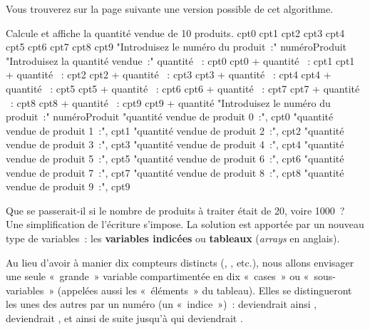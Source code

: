 		Vous trouverez sur la page suivante une version possible de cet
		algorithme.
	
		\vfill
		\begin{pseudocode}
		\LComment Calcule et affiche la quantité vendue de 10 produits.
			\Empty
			\Empty
			\Let cpt0 
			\Let cpt1 
			\Let cpt2 
			\Let cpt3 
			\Let cpt4 
			\Let cpt5 
			\Let cpt6 
			\Let cpt7 
			\Let cpt8 
			\Let cpt9 
			\Empty
			\Write "Introduisez le numéro du produit~:"
			\Read numéroProduit
			\Empty
			\Empty
				\Write "Introduisez la quantité vendue~:"
				\Read quantité
				\Empty
					~: cpt0 \Gets cpt0 + quantité
					~: cpt1 \Gets cpt1 + quantité
					~: cpt2 \Gets cpt2 + quantité
					~: cpt3 \Gets cpt3 + quantité
					~: cpt4 \Gets cpt4 + quantité
					~: cpt5 \Gets cpt5 + quantité
					~: cpt6 \Gets cpt6 + quantité
					~: cpt7 \Gets cpt7 + quantité
					~: cpt8 \Gets cpt8 + quantité
					~: cpt9 \Gets cpt9 + quantité
				\EndSwitch
				\Empty
				\Write "Introduisez le numéro du produit~:"
				\Read numéroProduit
				\Empty
			\EndWhile
			\Empty
			\Write "quantité vendue de produit 0~:", cpt0
			\Write "quantité vendue de produit 1~:", cpt1
			\Write "quantité vendue de produit 2~:", cpt2
			\Write "quantité vendue de produit 3~:", cpt3
			\Write "quantité vendue de produit 4~:", cpt4
			\Write "quantité vendue de produit 5~:", cpt5
			\Write "quantité vendue de produit 6~:", cpt6
			\Write "quantité vendue de produit 7~:", cpt7
			\Write "quantité vendue de produit 8~:", cpt8
			\Write "quantité vendue de produit 9~:", cpt9
			\Empty
		\EndAlgo
		\end{pseudocode}

		Que se passerait-il si le nombre de produits à traiter était de 20, voire
		1000~? Une simplification de l'écriture s'impose.  La solution est
		apportée par un nouveau type de variables~: les \textbf{variables
		indicées} ou \textbf{tableaux} (\textit{arrays} en anglais).
	
		Au lieu d’avoir à manier dix compteurs distincts
		(, , etc.), 
		nous allons envisager une seule «~grande~» variable 
		 compartimentée en dix «~cases~» ou «~sous-variables~»
		(appelées aussi les «~éléments~» du tableau). 
		Elles se distingueront les unes des autres par un numéro 
		(un «~indice~»)~: 
		 deviendrait ainsi , 
		 deviendrait , 
		et ainsi de suite jusqu’à
		 qui deviendrait .
	
